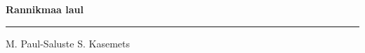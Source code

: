 \documentclass[10pt]{book}
\begin{document}
{
  \samepage
  \raggedbottom
  \raggedright
  \sloppy


  \vspace{0.2in}

  \noindent\begin{minipage}{.1\textwidth}
    \hfill\vspace{0.1in}
  \end{minipage}%
  \noindent\begin{minipage}{.8\textwidth}
    \centering
    \bfseries
    \large Rannikmaa laul
  \end{minipage}%
  \noindent\begin{minipage}{.1\textwidth}
      \hfill\vspace{0.1in}
  \end{minipage}

  \nopagebreak[4]
  \vspace{0.1in}
  \nopagebreak[4]
  \hrule height 0.05ex
  \nopagebreak[4]
  \vspace{-0.05in}

  {\footnotesize M. Paul-Saluste \hfill S. Kasemets }\\
  \vspace{0.01in}



}
\end{document}

